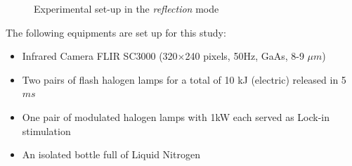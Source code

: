 \documentclass[]{spie}  %
\begin{document}
\begin{figure}[ht]
   \centering
   \caption{Experimental set-up in the \textit{reflection} mode}
   \label{Exp_setup}
\end{figure}

The following equipments are set up for this study:
\begin{itemize}
   \item Infrared Camera FLIR SC3000 (320$\times$240 pixels, 50Hz, GaAs, 8-9 $\mu m$)
   \item Two pairs of flash halogen lamps for a total of 10 kJ (electric) released in 5 $ms$ 
   \item One pair of modulated halogen lamps with 1kW each served as Lock-in stimulation
   \item An isolated bottle full of Liquid Nitrogen
\end{itemize}
\end{document}
